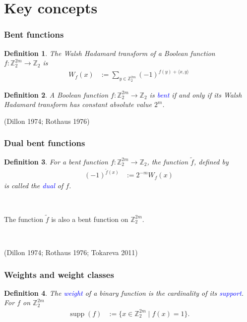 \documentclass[pdf,sprung,slideColor,nocolorBG]{beamer}
\newenvironment{colortheme}[1]{
\def\ProvidesPackageRCS $##1${\relax}
\renewcommand{\ProcessOptions}{\relax}
\makeatletter

\makeatother
}{}
\newcommand{\slidecite}[1]{\tiny{(#1)}\normalsize{}}
\newcommand{\mb}[1]{\mathbb{#1}}
\newcommand{\Emph}[1]{\emph{\textcolor{blue}{#1}}}
\newcommand{\To}{\rightarrow}
\newcommand{\dual}[1]{\widetilde{#1}}
\newcommand{\support}[1]{\operatorname{supp}\left(#1\right)}
\newcommand{\Z}{\mb{Z}}
\newtheorem{Def}{Definition}
\begin{document}
\section{Key concepts}
\begin{colortheme}{seagull}
\begin{frame}
\frametitle{Bent functions}
\begin{Def}
\label{def-Walsh-Hadamard-transform}
The Walsh Hadamard transform of
a Boolean function $f : \Z_2^{2m} \To \Z_2$ is
\begin{align*}
W_f(x)
&:=
\sum_{y \in \Z_2^{2m}} (-1)^{f(y) + \langle x, y \rangle}
\end{align*}
\end{Def}

\begin{Def}
\label{def-Bent-function}
A Boolean function $f : \Z_2^{2m} \To \Z_2$ is \Emph{bent}
if and only if its Walsh Hada\-mard transform has constant absolute value $2^{m}$.
\end{Def}
\slidecite{Dillon 1974; Rothaus 1976}
\end{frame}
\begin{frame}
\frametitle{Dual bent functions}

\begin{Def}
\label{def-dual-Bent-function}
For a bent function  $f : \Z_2^{2m} \To \Z_2$, the function $\dual{f}$, defined by
\begin{align*}
(-1)^{\dual{f}(x)} &:= 2^{-m} W_f(x)
\end{align*}
is called the \Emph{dual} of $f$.
\end{Def}

~

The function $\dual{f}$ is also a bent function on $\Z_2^{2m}$.

~

\slidecite{Dillon 1974; Rothaus 1976; Tokareva 2011}
\end{frame}

\begin{colortheme}{jubata}
\begin{frame}
\frametitle{Weights and weight classes}
\begin{Def}
The \Emph{weight} of a binary function is the cardinality of its \Emph{support}.
For $f$ on $\Z_2^{2m}$
\begin{align*}
\support{f} &:= \{x \in \Z_2^{2m} \mid f(x)=1 \}.
\end{align*}


\end{Def}
\end{frame}
\end{colortheme}
\end{colortheme}
\end{document}
